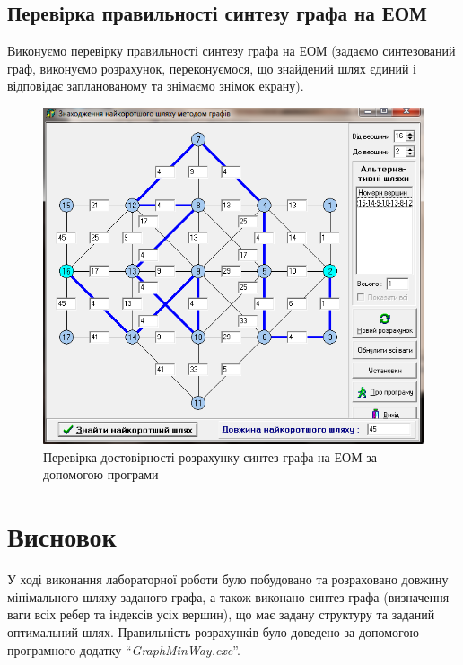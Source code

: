 \subsection{Перевірка правильності синтезу графа на ЕОМ}
Виконуємо перевірку правильності синтезу графа на ЕОМ (задаємо синтезований граф, виконуємо
розрахунок, переконуємося, що знайдений шлях єдиний і відповідає запланованому та знімаємо знімок
екрану).
\begin{figure}[!ht]
  \centering
  \includegraphics[width=.75\textwidth]{images/lab3/image7.png}
  \caption{Перевірка достовірності розрахунку синтез графа на ЕОМ за допомогою програми}
  \label{f:graph_calculation_check_2}
\end{figure}

\newpage
\section*{Висновок}

У ході виконання лабораторної роботи було побудовано та розраховано довжину мінімального шляху
заданого графа, а також виконано синтез графа (визначення ваги всіх ребер та індексів усіх вершин),
що має задану структуру та заданий оптимальний шлях. Правильність розрахунків було доведено за
допомогою програмного додатку ``\emph{GraphMinWay.exe}''.
